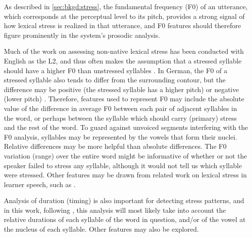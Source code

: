 	As described in \cref{sec:bkgd:stress}, the fundamental frequency (F0) of an utterance, which corresponds at the perceptual level to its pitch, provides a strong signal of how lexical stress is realized in that utterance, and F0 features should therefore figure prominently in the system's prosodic analysis. 
	
	Much of the work on assessing non-native lexical stress has been conducted with English as the L2, and thus often makes the assumption that a stressed syllable should have a higher F0 than unstressed syllables \citep{Bonneau2011}. In German, the F0 of a stressed syllable also tends to differ from the surrounding contour, but the difference may be positive (the stressed syllable has a higher pitch) or negative (lower pitch) \citep[p.~267]{Cutler2005}. Therefore, features used to represent F0 may include the absolute value of the difference in average F0 between each pair of adjacent syllables in the word, or perhaps between the syllable which should carry (primary) stress and the rest of the word. To guard against unvoiced segments interfering with the F0 analysis, syllables may be represented by the vowels that form their nuclei. Relative differences may be more helpful than absolute differences. The F0 variation (range) over the entire word might be informative of whether or not the speaker failed to stress any syllable, although it would not tell us which syllable were stressed. Other features may be drawn from related work on lexical stress in learner speech, such as \textcite{Bonneau2011}.
	

	Analysis of duration (timing) is also important for detecting stress patterns, and in this work, following \textcite{Bonneau2011}, this analysis will most likely take into account the relative durations of each syllable of the word in question, and/or of the vowel at the nucleus of each syllable. Other features may also be explored.

